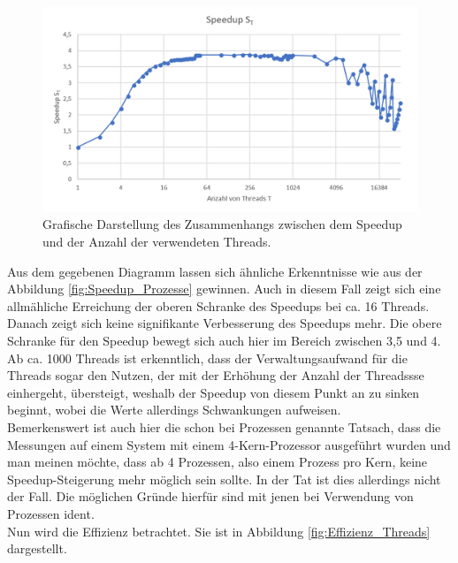\begin{description}
						\begin{figure}
							\centering	
							\includegraphics[width=12cm]{Abbildungen/Speedup_Threads.png}
							\caption{Grafische Darstellung des Zusammenhangs zwischen dem Speedup und der Anzahl der verwendeten Threads.}
							\label{fig:Speedup_Threads}
						\end{figure}
						
						Aus dem gegebenen Diagramm lassen sich ähnliche Erkenntnisse wie aus der Abbildung \ref{fig:Speedup_Prozesse} gewinnen. Auch in diesem Fall zeigt sich eine allmähliche Erreichung der oberen Schranke des Speedups bei ca. 16 Threads. Danach zeigt sich keine signifikante Verbesserung des Speedups mehr. Die obere Schranke für den Speedup bewegt sich auch hier im Bereich zwischen 3,5 und 4. Ab ca. 1000 Threads ist erkenntlich, dass der Verwaltungsaufwand für die Threads sogar den Nutzen, der mit der Erhöhung der Anzahl der Threadssse einhergeht, übersteigt, weshalb der Speedup von diesem Punkt an zu sinken beginnt, wobei die Werte allerdings Schwankungen aufweisen.\\
						Bemerkenswert ist auch hier die schon bei Prozessen genannte Tatsach, dass die Messungen auf einem System mit einem 4-Kern-Prozessor ausgeführt wurden und man meinen möchte, dass ab 4 Prozessen, also einem Prozess pro Kern, keine Speedup-Steigerung mehr möglich sein sollte. In der Tat ist dies allerdings nicht der Fall. Die möglichen Gründe hierfür sind mit jenen bei Verwendung von Prozessen ident.\\
						Nun wird die Effizienz betrachtet. Sie ist in Abbildung \ref{fig:Effizienz_Threads} dargestellt.
						

\end{description}
